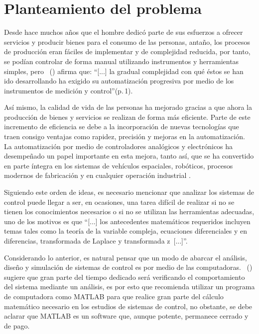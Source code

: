 \section{Planteamiento del problema}
	Desde hace muchos años que el hombre dedicó parte de sus esfuerzos a ofrecer servicios y producir bienes para el consumo de las personas, antaño, los procesos de producción eran fáciles de implementar y de complejidad reducida, por tanto, se podían controlar de forma manual utilizando instrumentos y herramientas simples, pero \citeauthor{creus2010instrumentacion}~(\citeyear{creus2010instrumentacion}) afirma que: \enquote{[...] la gradual complejidad con qué éstos se han ido desarrollando ha exigido su automatización progresiva por medio de los instrumentos de medición y control}(p.$\,$1).
	
	Así mismo, la calidad de vida de las personas ha mejorado gracias a que ahora la producción de bienes y servicios se realizan de forma más eficiente. Parte de este incremento de eficiencia se debe a la incorporación de nuevas tecnologías que traen consigo ventajas como rapidez, precisión y mejoras en la automatización. La automatización por medio de controladores analógicos y electrónicos ha desempeñado un papel importante en esta mejora, tanto así, que se ha convertido en parte íntegra en los sistemas de vehículos espaciales, robóticos, procesos modernos de fabricación y en cualquier operación industrial \Parencite{ogata2003ingenieria}.
		
	Siguiendo este orden de ideas, es necesario mencionar que analizar los sistemas de control puede llegar a ser, en ocasiones, una tarea difícil de realizar si no se tienen los conocimientos necesarios o si no se utilizan las herramientas adecuadas, uno de los motivos es que \enquote{[...] los antecedentes matemáticos requeridos incluyen temas tales como la teoría de la variable compleja, ecuaciones diferenciales y en diferencias, transformada de Laplace y transformada z~[...]}\parencite[p.$\,$21]{kuo1996sistemas}.
	
	Considerando lo anterior, es natural pensar que un modo de abarcar el análisis, diseño y simulación de sistemas de control es por medio de las computadoras. \citeauthor{ogata2003ingenieria}~(\citeyear{ogata2003ingenieria}) sugiere que gran parte del tiempo dedicado será verificando el comportamiento del sistema mediante un análisis, es por esto que recomienda utilizar un programa de computadora como MATLAB para que realice gran parte del cálculo matemático necesario en los estudios de sistemas de control, no obstante, se debe aclarar que MATLAB es un software que, aunque potente, permanece cerrado y de pago.
	
